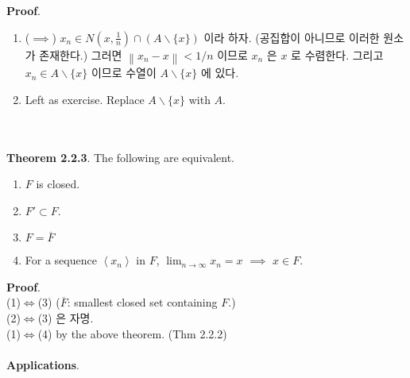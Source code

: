 \documentclass[12pt]{report}
\newcommand{\norm}[1]{\left\lVert#1\right\rVert}
\renewcommand{\span}[1]{\left\langle #1 \right\rangle}
\newcommand{\ds}{\displaystyle}
\newcommand{\imp}{\implies}
\newcommand{\bs}{\backslash}
\begin{document}
\textbf{Proof}.
\begin{enumerate}
	\item ($\imp$) $x_n\in N\left(x, \frac{1}{n} \right) \cap (A\backslash \{x\})$ 이라 하자. (공집합이 아니므로 이러한 원소가 존재한다.) 그러면 $\norm{x_n-x}<1/n$ 이므로 $x_n$ 은 $x$ 로 수렴한다. 그리고 $x_n\in A\backslash\{x\}$ 이므로 수열이 $A\backslash\{x\}$ 에 있다.
	\item Left as exercise. Replace $A\bs \{x\} $ with $A$.
\end{enumerate}~\\
\\
\textbf{Theorem 2.2.3}. The following are equivalent.
\begin{enumerate}
	\item $F$ is closed.
	\item $F'\subset F$.
	\item $F =\overline{F}$
	\item For a sequence $\span{x_n}$ in $F$, $\ds\lim_{n\rightarrow \infty} x_n = x$ $\imp$ $x\in F$.
\end{enumerate}
\textbf{Proof}. \\
(1)$\iff$(3) ($\overline{F}$: smallest closed set containing $F$.)\\
(2)$\iff$(3) 은 자명.\\
(1)$\iff$(4) by the above theorem. (Thm 2.2.2)\\
\\
\textbf{Applications}.
\end{document}
